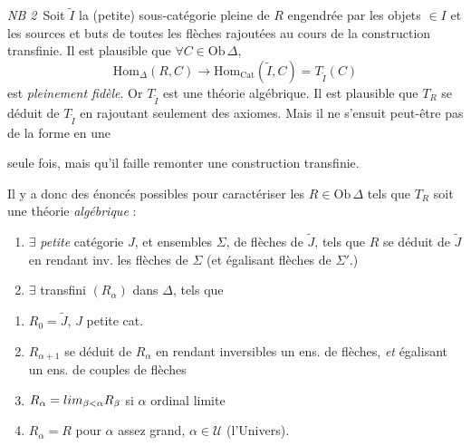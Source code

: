 \documentclass[11pt,a4paper]{article}
\begin{document}
\emph{NB 2}\ Soit $\tilde{I}$ la (petite) sous-catégorie pleine de
$R$ engendrée par les objets $\in I$ et les 
sources et buts de toutes les flèches rajoutées au cours de la
construction transfinie. Il est plausible que $\forall C \in
\mathrm{Ob}\,\Delta$,
\[
  \mathrm{Hom}_{\Delta}(R, C) \longrightarrow
  \mathrm{Hom}_{\mathrm{Cat}}(\tilde{I}, C) = T_{\tilde{I}}(C)
\]
 est \emph{pleinement fidèle}. Or $T_{\tilde{I}}$ est une
théorie algébrique. Il est plausible  que \struck{\ill{}}
$T_{R}$ se déduit de $T_{\tilde{I}}$ \struck{\ill{}} en rajoutant
seulement des axiomes. Mais il ne s'ensuit peut-être pas de la forme en une

seule fois, mais qu'il faille remonter une construction transfinie.

Il y a donc des énoncés possibles pour caractériser les $R \in
\mathrm{Ob}\,\Delta$ tels que $T_{R}$ soit une théorie
\emph{algébrique} :
\begin{enumerate}
  \item[1)] $\exists$ \emph{petite} catégorie $J$, et ensembles
    $\Sigma$,  de flèches de $\tilde{J}$, tels que $R$
    se déduit de $\tilde{J}$ en rendant inv. les flèches de $\Sigma$
    (et égalisant  flèches de $\Sigma'$.)
  \item[2)]  $\exists$
      transfini
    $(R_{\alpha})$ dans $\Delta$, tels que
\end{enumerate}

\begin{enumerate}
  \item[(i)] $R_{0} = \tilde{J}$, $J$ petite cat.
  \item[(ii)] $R_{\alpha+1}$ se déduit de $R_{\alpha}$ en rendant
    inversibles un  ens. de flèches, \emph{et}
    égalisant un ens.  de couples de flèches
  \item[(iii)] $R_{\alpha} = \varinjlim_{\beta < \alpha} R_{\beta}$
    si $\alpha$ ordinal limite
  \item[(iv)] $R_{\alpha} = R$ pour $\alpha$ assez grand, $\alpha \in
    \mathcal{U}$ (l'Univers).
\end{enumerate}
\end{document}
